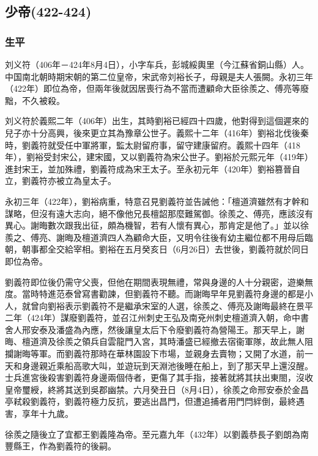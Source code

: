 
\subsection{少帝\tiny(422-424)}

\subsubsection{生平}

刘义符（406年－424年8月4日），小字车兵，彭城綏輿里（今江蘇省銅山縣）人。中国南北朝時期宋朝的第二位皇帝，宋武帝刘裕长子，母親是夫人張闕。永初三年（422年）即位為帝，但兩年後就因居喪行為不當而遭顧命大臣徐羨之、傅亮等廢黜，不久被殺。

刘义符於義熙二年（406年）出生，其時劉裕已經四十四歲，他對得到這個遲來的兒子亦十分高興，後來更立其為豫章公世子。義熙十二年（416年）劉裕北伐後秦時，劉義符就受任中軍將軍，監太尉留府事，留守建康留府。義熙十四年（418年），劉裕受封宋公，建宋國，又以劉義符為宋公世子。劉裕於元熙元年（419年）進封宋王，並加殊禮，劉義符成為宋王太子。至永初元年（420年）劉裕篡晉自立，劉義符亦被立為皇太子。

永初三年（422年），劉裕病重，特意召見劉義符並告誡他：「檀道濟雖然有才幹和謀略，但沒有遠大志向，絕不像他兄長檀韶那麼難駕御。徐羨之、傅亮，應該沒有異心。謝晦數次跟我出征，頗為機智，若有人懷有異心，那肯定是他了。」並以徐羨之、傅亮、謝晦及檀道濟四人為顧命大臣，又明令往後有幼主繼位都不用母后臨朝，朝事都全交給宰相。劉裕在五月癸亥日（6月26日）去世後，劉義符就於同日即位為帝。

劉義符即位後仍需守父喪，但他在期間表現無禮，常與身邊的人十分親密，遊樂無度。當時特進范泰曾寫書勸諫，但劉義符不聽。而謝晦早年見劉義符身邊的都是小人，就曾向劉裕表示劉義符不是繼承宋室的人選，徐羨之、傅亮及謝晦最終在景平二年（424年）謀廢劉義符，並召江州刺史王弘及南兗州刺史檀道濟入朝，命中書舍人邢安泰及潘盛為內應，然後讓皇太后下令廢劉義符為營陽王。那天早上，謝晦、檀道濟及徐羨之領兵自雲龍門入宮，其時潘盛已經撤去宿衞軍隊，故此無人阻攔謝晦等軍。而劉義符那時在華林園設下市場，並親身去賣物；又開了水道，前一天和身邊親近乘船高歌大叫，並遊玩到天淵池後睡在船上，到了那天早上還沒醒。士兵進宮後殺害劉義符身邊兩個侍者，更傷了其手指，接著就將其扶出東閤，沒收皇帝璽綬，終將其送到吳郡幽禁。六月癸丑日（8月4日），徐羨之命邢安泰於金昌亭弒殺劉義符，劉義符極力反抗，要逃出昌門，但遭追捕者用門閂絆倒，最終遇害，享年十九歲。

徐羨之隨後立了宜都王劉義隆為帝。至元嘉九年（432年）以劉義恭長子劉朗為南豐縣王，作為劉義符的後嗣。

